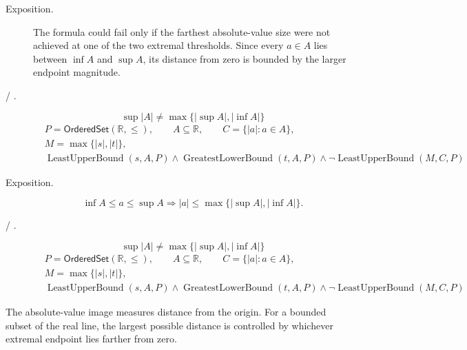 \begin{remark*}
\begin{description}
  \item[Exposition.]
The formula could fail only if the farthest absolute-value size were not achieved at one of the two extremal thresholds. Since every $a\in A$ lies between $\inf A$ and $\sup A$, its distance from zero is bounded by the larger endpoint magnitude.


  \item[ / .]
  \[
\sup |A|\ne \max\{|\sup A|,|\inf A|\}
\]
\[
\begin{aligned}
&P=\mathsf{OrderedSet}(\mathbb{R},\leq),\qquad A\subseteq\mathbb{R},\qquad C=\{|a|:a\in A\},\\
&M=\max\{|s|,|t|\},\\
&\operatorname{LeastUpperBound}(s,A,P)\land \operatorname{GreatestLowerBound}(t,A,P)
\land
\neg\operatorname{LeastUpperBound}(M,C,P)
\end{aligned}
\]
\end{description}
\end{remark*}

\begin{remark*}
\begin{description}
  \item[Exposition.]
\[
\inf A\le a\le \sup A
\Longrightarrow
|a|\le \max\{|\sup A|,|\inf A|\}.
\]


  \item[ / .]
  \[
\sup |A|\ne \max\{|\sup A|,|\inf A|\}
\]
\[
\begin{aligned}
&P=\mathsf{OrderedSet}(\mathbb{R},\leq),\qquad A\subseteq\mathbb{R},\qquad C=\{|a|:a\in A\},\\
&M=\max\{|s|,|t|\},\\
&\operatorname{LeastUpperBound}(s,A,P)\land \operatorname{GreatestLowerBound}(t,A,P)
\land
\neg\operatorname{LeastUpperBound}(M,C,P)
\end{aligned}
\]
\end{description}
\end{remark*}

\begin{remark*}[Interpretation]
The absolute-value image measures distance from the origin. For a bounded subset of the real line, the largest possible distance is controlled by whichever extremal endpoint lies farther from zero.
\end{remark*}

